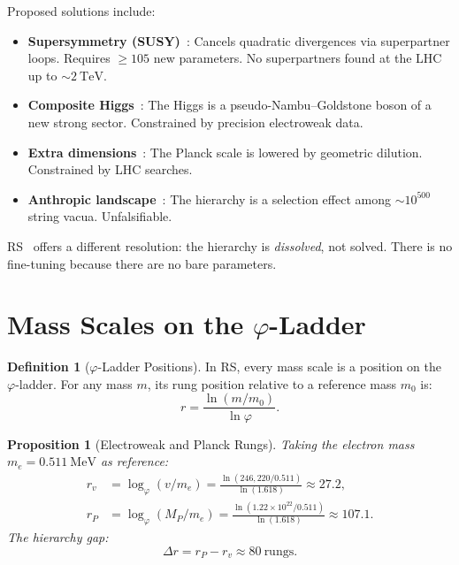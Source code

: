 \documentclass[12pt,a4paper]{article}
\newtheorem{proposition}[theorem]{Proposition}
\theoremstyle{definition}
\newtheorem{definition}[theorem]{Definition}
\theoremstyle{remark}
\begin{document}
Proposed solutions include:
\begin{itemize}
  \item \textbf{Supersymmetry (SUSY)}~\cite{Dimopoulos1981}:
  Cancels quadratic divergences via superpartner loops.
  Requires $\geq 105$ new parameters.  No superpartners
  found at the LHC up to $\sim 2~\mathrm{TeV}$.
  \item \textbf{Composite Higgs}~\cite{Kaplan1984}: The Higgs
  is a pseudo-Nambu--Goldstone boson of a new strong sector.
  Constrained by precision electroweak data.
  \item \textbf{Extra dimensions}~\cite{ArkaniHamed1998}: The
  Planck scale is lowered by geometric dilution.
  Constrained by LHC searches.
  \item \textbf{Anthropic landscape}~\cite{Bousso2000}: The
  hierarchy is a selection effect among $\sim 10^{500}$
  string vacua.  Unfalsifiable.
\end{itemize}

RS~\cite{RS_Axioms} offers a different resolution: the hierarchy is
\emph{dissolved}, not solved.  There is no fine-tuning
because there are no bare parameters.

\section{Mass Scales on the $\varphi$-Ladder}
\label{sec:ladder}

\begin{definition}[$\varphi$-Ladder Positions]
\label{def:rungs}
In RS, every mass scale is a position on the
$\varphi$-ladder.  For any mass $m$, its rung position
relative to a reference mass $m_0$ is:
\begin{equation}
  r = \frac{\ln(m/m_0)}{\ln\varphi}.
\end{equation}
\end{definition}

\begin{proposition}[Electroweak and Planck Rungs]
\label{prop:rungs}
Taking the electron mass $m_e = 0.511~\mathrm{MeV}$ as
reference:
\begin{align}
  r_v &= \log_\varphi(v/m_e)
  = \frac{\ln(246{,}220/0.511)}{\ln(1.618)}
  \approx 27.2, \label{eq:rv} \\
  r_P &= \log_\varphi(M_P/m_e)
  = \frac{\ln(1.22 \times 10^{22}/0.511)}{\ln(1.618)}
  \approx 107.1. \label{eq:rP}
\end{align}
The hierarchy gap:
\begin{equation}
  \Delta r = r_P - r_v \approx 80~\text{rungs}.
  \label{eq:gap}
\end{equation}
\end{proposition}
\end{document}
